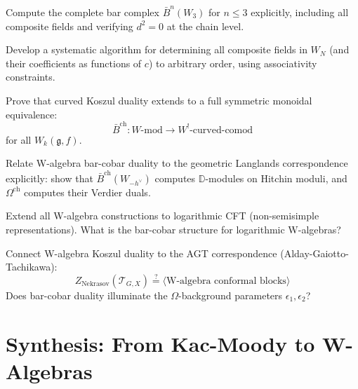 \begin{openproblem}[1]
Compute the complete bar complex $\bar{B}^n(W_3)$ for $n \le 3$ explicitly, including all composite fields and verifying $d^2 = 0$ at the chain level.
\end{openproblem}

\begin{openproblem}[2]
Develop a systematic algorithm for determining all composite fields in $W_N$ (and their coefficients as functions of $c$) to arbitrary order, using associativity constraints.
\end{openproblem}

\begin{openproblem}[3]
Prove that curved Koszul duality extends to a full symmetric monoidal equivalence:
$$\bar{B}^{\text{ch}}: W\text{-mod} \to W^!\text{-curved-comod}$$
for all $W_k(\mathfrak{g}, f)$.
\end{openproblem}

\begin{openproblem}[4]
Relate W-algebra bar-cobar duality to the geometric Langlands correspondence explicitly: show that $\bar{B}^{\text{ch}}(W_{-h^\vee})$ computes $\mathbb{D}$-modules on Hitchin moduli, and $\Omega^{\text{ch}}$ computes their Verdier duals.
\end{openproblem}

\begin{openproblem}[5]
Extend all W-algebra constructions to logarithmic CFT (non-semisimple representations). What is the bar-cobar structure for logarithmic W-algebras?
\end{openproblem}

\begin{openproblem}[6]
Connect W-algebra Koszul duality to the AGT correspondence (Alday-Gaiotto-Tachikawa):
$$Z_{\text{Nekrasov}}(\mathcal{T}_{G,X}) \overset{?}{=} \langle \text{W-algebra conformal blocks} \rangle$$
Does bar-cobar duality illuminate the $\Omega$-background parameters $\epsilon_1, \epsilon_2$?
\end{openproblem}

\section{Synthesis: From Kac-Moody to W-Algebras}

